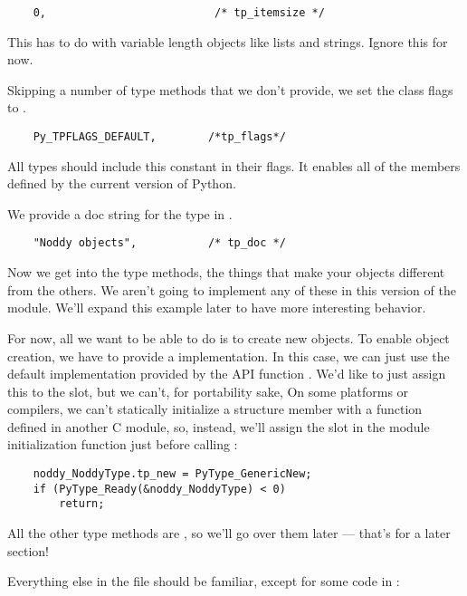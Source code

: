 \begin{verbatim}
    0,                          /* tp_itemsize */
\end{verbatim}

This has to do with variable length objects like lists and strings.
Ignore this for now.

Skipping a number of type methods that we don't provide, we set the
class flags to . 

\begin{verbatim}
    Py_TPFLAGS_DEFAULT,        /*tp_flags*/
\end{verbatim}

All types should include this constant in their flags.  It enables all
of the members defined by the current version of Python.

We provide a doc string for the type in .

\begin{verbatim}
    "Noddy objects",           /* tp_doc */
\end{verbatim}

Now we get into the type methods, the things that make your objects
different from the others.  We aren't going to implement any of these
in this version of the module.  We'll expand this example later to 
have more interesting behavior.  

For now, all we want to be able to do is to create new 
objects. To enable object creation, we have to provide a
 implementation. In this case, we can just use the
default implementation provided by the API function
.  We'd like to just assign this to the
 slot, but we can't, for portability sake, On some
platforms or compilers, we can't statically initialize a structure
member with a function defined in another C module, so, instead, we'll
assign the  slot in the module initialization function
just before calling :

\begin{verbatim}
    noddy_NoddyType.tp_new = PyType_GenericNew;
    if (PyType_Ready(&noddy_NoddyType) < 0)
        return;
\end{verbatim}

All the other type methods are \NULL, so we'll go over them later
--- that's for a later section!

Everything else in the file should be familiar, except for some code
in :


